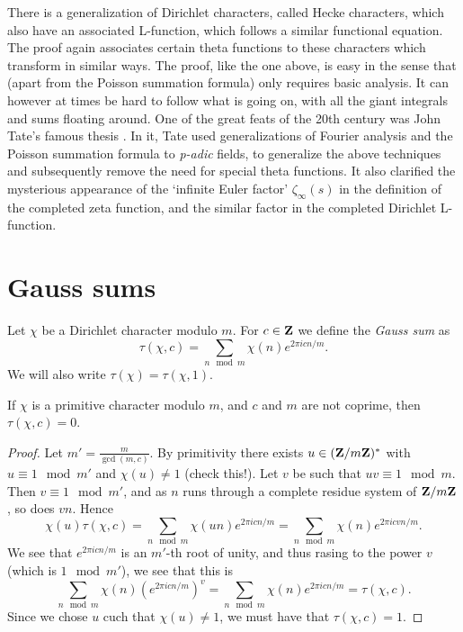 \documentclass{amsart}
\begin{document}
There is a generalization of Dirichlet characters, called Hecke characters, which also have an associated L-function, which follows a similar functional equation. The proof again associates certain theta functions to these characters which transform in similar ways. The proof, like the one above, is easy in the sense that (apart from the Poisson summation formula) only requires basic analysis. It can however at times be hard to follow what is going on, with all the giant integrals and sums floating around. One of the great feats of the 20th century was John Tate's famous thesis \cite{tate50}. In it, Tate used generalizations of Fourier analysis and the Poisson summation formula to \emph{p-adic} fields, to generalize the above techniques and subsequently remove the need for special theta functions. It also clarified the mysterious appearance of the `infinite Euler factor' $\zeta_\infty(s)$ in the definition of the completed zeta function, and the similar factor in the completed Dirichlet L-function.


\appendix
\section{Gauss sums}
\label{app:gsums}
Let $\chi$ be a Dirichlet character modulo $m$. For $c\in \mathbf{Z}$ we define the \emph{Gauss sum} as
\[\tau(\chi, c) = \sum_{n \mod m}\chi(n)e^{2\pi i cn/m}. \]
We will also write $\tau(\chi) = \tau(\chi, 1)$.

\begin{lemma}
  \label{lem:nonprim}
  If $\chi$ is a primitive character modulo $m$, and $c$ and $m$ are not coprime, then $\tau(\chi, c) = 0$.
\end{lemma}

\begin{proof}
  Let  $m' = \frac{m}{\gcd(m,c)}$. By primitivity there exists $u \in (\mathbf{Z}/m\mathbf{Z})^*$ with $u\equiv 1\mod m'$ and $\chi(u)\neq 1$ (check this!). Let $v$ be such that $uv\equiv 1 \mod m$. Then $v \equiv 1\mod m'$, and as $n$ runs through a complete residue system of $\mathbf{Z}/m\mathbf{Z}$, so does $vn$. Hence
  \[\chi(u) \tau(\chi,c) = \sum_{n \mod m}\chi(un)e^{2\pi i cn/m} =  \sum_{n \mod m}\chi(n)e^{2\pi i cvn/m}. \]
  We see that $e^{2\pi i cn/m}$ is an $m'$-th root of unity, and thus rasing to the power $v$ (which is $1\mod m'$), we see that this is
  \[\sum_{n \mod m}\chi(n)\left( e^{2\pi i cn/m}\right)^v = \sum_{n \mod m}\chi(n)e^{2\pi i cn/m} = \tau(\chi,c). \]
  Since we chose $u$ cuch that $\chi(u)\neq 1$, we must have that $\tau(\chi,c)=1$.
\end{proof}
\end{document}
